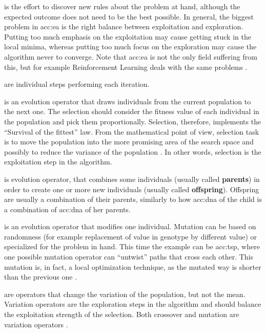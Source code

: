  is the effort to discover new rules about the problem at hand, although the expected outcome does not need to be the best possible. In general, the biggest problem in \acrshort{acc:ea} is the right balance between exploitation and exploration. Putting too much emphasis on the exploitation may cause getting stuck in the local minima, whereas putting too much focus on the exploration may cause the algorithm never to converge. Note that \acrshort{acc:ea} is not the only field suffering from this, but for example Reinforcement Learning deals with the same problems \citep{ExplorationExploitationDilemaRL}. 

 are individual steps performing each iteration.

 is an evolution operator that draws individuals from the current population to the next one. The selection should consider the fitness value of each individual in the population and pick them proportionally. Selection, therefore, implements the \enquote{Survival of the fittest} law. From the mathematical point of view, selection task is to move the population into the more promising area of the search space and possibly to reduce the variance of the population \citep{SelfAdaptiveFeaturesInRealParameterEvolutionaryAlgorithms}. In other words, selection is the exploitation step in the algorithm.

 is evolution operator, that combines some individuals (usually called \textbf{parents}) in order to create one or more new individuals (usually called \textbf{offspring}). Offspring are usually a combination of their parents, similarly to how \acrshort{acc:dna} of the child is a combination of \acrshort{acc:dna} of her parents.

 is an evolution operator that modifies one individual. Mutation can be based on randomness (for example replacement of value in genotype by different value) or specialized for the problem in hand. This time the example can be \acrlong{acc:tsp}, where one possible mutation operator can \enquote{untwist} paths that cross each other. This mutation is, in fact, a local optimization technique, as the mutated way is shorter than the previous one \citep{TSPArticle}.

 are operators that change the variation of the population, but not the mean. Variation operators are the exploration steps in the algorithm and should balance the exploitation strength of the selection. Both crossover and mutation are variation operators \citep{SelfAdaptiveFeaturesInRealParameterEvolutionaryAlgorithms}.

